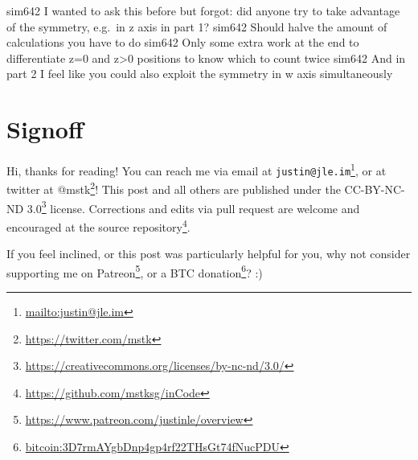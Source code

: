 \documentclass[]{article}
\renewcommand{\href}[2]{#2\footnote{\url{#1}}}
\begin{document}
sim642 I wanted to ask this before but forgot: did anyone try to take advantage
of the symmetry, e.g.~in z axis in part 1? sim642 Should halve the amount of
calculations you have to do sim642 Only some extra work at the end to
differentiate z=0 and z\textgreater0 positions to know which to count twice
sim642 And in part 2 I feel like you could also exploit the symmetry in w axis
simultaneously

\hypertarget{signoff}{%
\section{Signoff}\label{signoff}}

Hi, thanks for reading! You can reach me via email at
\href{mailto:justin@jle.im}{\nolinkurl{justin@jle.im}}, or at twitter at
\href{https://twitter.com/mstk}{@mstk}! This post and all others are published
under the \href{https://creativecommons.org/licenses/by-nc-nd/3.0/}{CC-BY-NC-ND
3.0} license. Corrections and edits via pull request are welcome and encouraged
at \href{https://github.com/mstksg/inCode}{the source repository}.

If you feel inclined, or this post was particularly helpful for you, why not
consider \href{https://www.patreon.com/justinle/overview}{supporting me on
Patreon}, or a \href{bitcoin:3D7rmAYgbDnp4gp4rf22THsGt74fNucPDU}{BTC donation}?
:)
\end{document}
